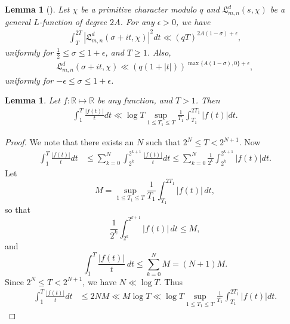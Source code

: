 \documentclass[10pt]{amsart}
\newtheorem{lemma}[theorem]{Lemma}
\begin{document}
\begin{lemma}[{\cite{JiangLu}}]\label{lem:genLbound}
Let $\chi$ be a primitive character modulo $q$ and $\mathfrak{L}_{m,n}^{d}(s,\chi)$ be a general $L$-function of degree $2A$. For any $\epsilon>0$, we have
\begin{align} \label{eq:genL2mom}
\int_{T}^{2T}\left|\mathfrak{L}_{m,n}^{d}(\sigma+it,\chi)\right|^{2}dt\ll (qT)^{2A(1-\sigma)+\epsilon},
\end{align}
uniformly for $\frac{1}{2}\leq\sigma\leq 1+\epsilon$, and $T\geq 1$. Also,
\begin{align} \label{eq:genLbound}
\mathfrak{L}_{m,n}^{d}(\sigma+it,\chi)\ll (q(1+|t|))^{\max\{A(1-\sigma),0\}+\epsilon},
\end{align}
uniformly for $-\epsilon\leq\sigma\leq 1+\epsilon$.
\end{lemma}
\begin{lemma} \label{lem:int}
    Let $f:\mathbb{R} \mapsto \mathbb{R}$ be any function, and $T > 1$. Then \begin{align}
        \int_{1}^{T}\frac{|f(t)|}{t}dt \ll \log T \sup_{1 \leq T_1 \leq T} \frac{1}{T_1}\int_{T_1}^{2T_1}|f(t)|dt.
    \end{align}
\end{lemma}
\begin{proof}
    We note that there exists an $N$ such that $2^N \leq T < 2^{N+1}$. Now  \begin{align}
        \int_{1}^{T}\frac{|f(t)|}{t}dt &\leq \sum_{k=0}^{N}\int_{2^k}^{2^{k+1}}\frac{|f(t)|}{t}dt \leq \sum_{k=0}^{N} \frac{1}{2^k}\int_{2^k}^{2^{k+1}}|f(t)|dt.
    \end{align}
   Let
\begin{equation*}
    M = \sup_{1 \leq T_1 \leq T} \frac{1}{T_1}\int_{T_1}^{2T_1}|f(t)|\,dt,
\end{equation*}
so that
\begin{equation}
    \frac{1}{2^k}\int_{2^k}^{2^{k+1}}|f(t)|\,dt \leq M,
\end{equation}
and
\begin{equation}
    \int_{1}^{T}\frac{|f(t)|}{t}\,dt \leq \sum_{k=0}^{N}M = (N+1)M.
\end{equation}
Since $2^N \leq T < 2^{N+1}$, we have $N \ll \log T$. Thus 
    \begin{align}
        \int_{1}^{T}\frac{|f(t)|}{t}dt &\leq 2NM \ll M\log T 
         \ll \log T \sup_{1\leq T_1 \leq T}\frac{1}{T_1}\int_{T_1}^{2T_1}|f(t)|dt.
    \end{align}
\end{proof}
\end{document}
